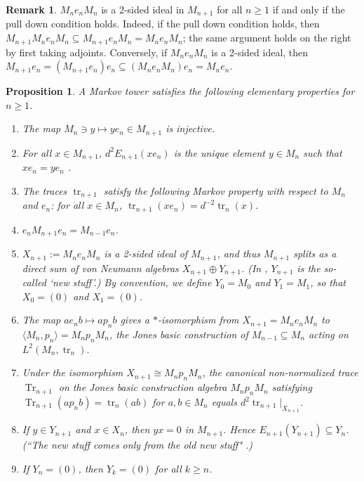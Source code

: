 \documentclass[11pt]{article}
\theoremstyle{plain}
\newtheorem{prop}[thm]{Proposition}
\theoremstyle{definition}
\newtheorem{rem}[thm]{Remark}
\DeclareMathOperator{\Tr}{Tr}
\DeclareMathOperator{\tr}{tr}
\begin{document}
\begin{rem}\label{pulldowniff}
$M_n e_n M_n$ is a 2-sided ideal in $M_{n+1}$ for all $n\geq 1$ if and only if the pull down condition holds. Indeed, if the pull down condition holds, then $M_{n+1} M_n e_n M_n \subseteq M_{n+1} e_n M_n = M_n e_n M_n$; the same argument holds on the right by first taking adjoints. Conversely, if $M_n e_n M_n$ is a 2-sided ideal, then $M_{n+1} e_n = (M_{n+1} e_n)e_n \subseteq (M_n e_n M_n) e_n = M_n e_n$.
\end{rem}




\begin{prop}\label{prop:ElementaryMarkov} A Markov tower satisfies the following elementary properties for $n\geq 1$.
\begin{enumerate}[label={\rm(EP\arabic*)}]
\item
\label{EP:Injective}
The map $M_{n}\ni y\mapsto ye_n \in M_{n+1}$ is injective.

\item
\label{EP:UniquePullDown}
For all $x\in M_{n+1}$, $d^{2}E_{n+1}(x e_n)$ is the unique element $y\in M_n$ such that $x e_n = ye_n$ \cite[Lem.~1.2]{MR860811}.

\item
\label{EP:MarkovTraces}
The traces $\tr_{n+1}$ satisfy the following \emph{Markov property} with respect to $M_n$ and $e_n$: for all $x\in M_n$, $\tr_{n+1}(xe_n) = d^{-2} \tr_n(x)$.

\item
\label{EP:CompressM_{n+1}}
$e_n M_{n+1}e_n = M_{n-1}e_n$.

\item
\label{EP:2SidedIdeal}
$X_{n+1}:=M_n e_n M_n$ is a 2-sided ideal of $M_{n+1}$, and thus $M_{n+1}$ splits as a direct sum of von Neumann algebras $X_{n+1}\oplus Y_{n+1}$.
(In \cite[Thm.~4.1.4 and Thm.~4.6.3]{MR999799}, $Y_{n+1}$ is the so-called `new stuff'.)
By convention, we define $Y_0 = M_0$ and $Y_1 = M_1$, so that $X_0 = (0)$ and $X_1 = (0)$.

\item
\label{EP:BasicContruction}
The map $ae_n b\mapsto ap_n b$ gives a $*$-isomorphism from $X_{n+1}=M_n e_n M_n$ to $\langle M_n , p_n\rangle=M_np_nM_n$, the Jones basic construction of $M_{n-1} \subseteq M_n$ acting on $L^2(M_n,\tr_n)$.

\item
\label{EP:OtherMarkovDef}
Under the isomorphism $X_{n+1} \cong M_n p_n M_n$, the canonical non-normalized trace $\Tr_{n+1}$ on the Jones basic construction algebra $M_np_nM_n$ satisfying $\Tr_{n+1}(ap_nb) = \tr_n(ab)$ for $a,b\in M_n$ equals $d^2 \tr_{n+1}|_{X_{n+1}}$.

\item
\label{EP:NewStuff}
If $y\in Y_{n+1}$ and $x\in X_{n}$, then $yx = 0$ in $M_{n+1}$.
Hence $E_{n+1}(Y_{n+1}) \subseteq Y_{n}$.
(``The new stuff comes only from the old new stuff" \cite{MR999799}.)

\item
\label{EP:FiniteDepth}
If $Y_n =(0)$, then $Y_{k} = (0)$ for all $k\geq n$.

\end{enumerate}
\end{prop}
\end{document}

